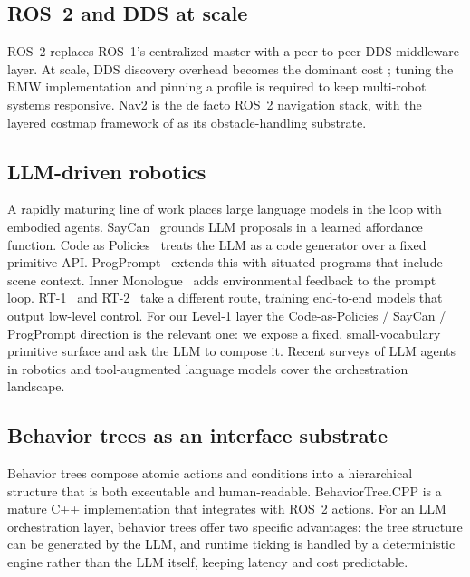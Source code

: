 \documentclass[conference]{IEEEtran}
\begin{document}
\subsection{ROS~2 and DDS at scale}

ROS~2 \cite{macenski2022ros2} replaces ROS~1's centralized
master with a peer-to-peer DDS middleware layer. At scale, DDS
discovery overhead becomes the dominant cost
\cite{maruyama2016dds,kronauer2024empirical}; tuning the RMW
implementation and pinning a profile is required to keep
multi-robot systems responsive. Nav2
\cite{macenski2020marathon,macenski2023nav2} is the de facto
ROS~2 navigation stack, with the layered costmap framework of
\cite{lu2014layered} as its obstacle-handling substrate.

\subsection{LLM-driven robotics}

A rapidly maturing line of work places large language models
in the loop with embodied agents.
SayCan~\cite{ahn2022saycan} grounds LLM proposals in a learned
affordance function. Code as Policies~\cite{liang2023codepolicies}
treats the LLM as a code generator over a fixed primitive API.
ProgPrompt~\cite{singh2023progprompt} extends this with situated
programs that include scene context. Inner
Monologue~\cite{huang2022inner} adds environmental feedback to
the prompt loop. RT-1~\cite{brohan2022rt1} and
RT-2~\cite{brohan2023rt2} take a different route, training
end-to-end models that output low-level control. For our
Level-1 layer the Code-as-Policies / SayCan / ProgPrompt
direction is the relevant one: we expose a fixed,
small-vocabulary primitive surface and ask the LLM to compose
it. Recent surveys of LLM agents in robotics
\cite{zeng2023llmrobsurvey} and tool-augmented language models
\cite{schick2023toolformer} cover the orchestration landscape.

\subsection{Behavior trees as an interface substrate}

Behavior trees \cite{colledanchise2018bt,iovino2022btsurvey}
compose atomic actions and conditions into a hierarchical
structure that is both executable and human-readable.
BehaviorTree.CPP \cite{btcpp} is a mature C++ implementation
that integrates with ROS~2 actions. For an LLM orchestration
layer, behavior trees offer two specific advantages: the tree
structure can be generated by the LLM, and runtime ticking is
handled by a deterministic engine rather than the LLM itself,
keeping latency and cost predictable.
\end{document}
